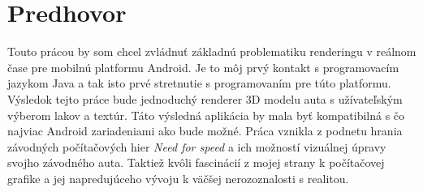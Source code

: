 \chapter*{Predhovor}\label{chap:predhovor}

Touto prácou by som chcel zvládnuť základnú problematiku renderingu v reálnom čase pre mobilnú platformu Android. Je to môj prvý kontakt s programovacím jazykom Java a tak isto prvé stretnutie s programovaním pre túto platformu. Výsledok tejto práce bude jednoduchý renderer 3D modelu auta s užívateľským výberom lakov a textúr. Táto výsledná aplikácia by mala byť kompatibilná s čo najviac Android zariadeniami ako bude možné. Práca vznikla z podnetu hrania závodných počítačových hier  {\itshape Need for speed} a ich možností vizuálnej úpravy svojho závodného auta. Taktiež kvôli fascinácií z mojej strany k počítačovej grafike a jej napredujúceho vývoju k väčšej nerozoznalosti s realitou. 